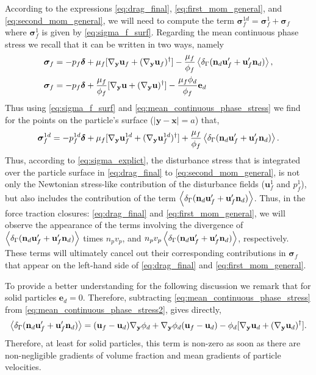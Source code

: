 According to the expressions \ref{eq:drag_final}, \ref{eq:first_mom_general}, and \ref{eq:second_mom_general}, we will need to compute the term $\bm\sigma^{1d}_f = \bm\sigma_f^1 + \bm\sigma_f$ where $\bm\sigma_f^1$ is given by \ref{eq:sigma_f_surf}. 
Regarding the mean continuous phase stress we recall that it can be written in two ways, namely 
\begin{align}
    \label{eq:mean_continuous_phase_stress}
    \bm\sigma_f
    &= - p_f \bm\delta 
    + \mu_f [\pddy \textbf{u}_f+ (\pddy \textbf{u}_f)^\dagger ]
    - \frac{\mu_f}{\phi_f}\avg{\delta_\Gamma (\textbf{n}_d \textbf{u}_f'+  \textbf{u}_f' \textbf{n}_d)}, \\
    \bm\sigma_f
    &= - p_f \bm\delta 
    + \frac{\mu_f}{\phi_f} [\pddy \textbf{u}+ (\pddy \textbf{u})^\dagger ]
    - \frac{\mu_f \phi_d}{\phi_f} \textbf{e}_d
    \label{eq:mean_continuous_phase_stress2}
\end{align}
Thus using \ref{eq:sigma_f_surf} and \ref{eq:mean_continuous_phase_stress} we find for the points on the particle's surface ($|\textbf{y}-\textbf{x}| = a$) that,
\begin{align}
    \bm\sigma_f^{1d}
    =
    - p_f^{1d} \bm\delta 
    + \mu_f [\pddy \textbf{u}_f^{1d}+ (\pddy \textbf{u}_f^{1d})^\dagger ]
    + \frac{\mu_f }{\phi_f}\avg{\delta_\Gamma (\textbf{n}_d \textbf{u}_f'+  \textbf{u}_f' \textbf{n}_d)}. 
    \label{eq:sigma_explict}
\end{align}
Thus, according to \ref{eq:sigma_explict}, the disturbance stress that is integrated over the particle surface in \ref{eq:drag_final} to \ref{eq:second_mom_general}, is not only the Newtonian stress-like contribution of the disturbance fields ($\textbf{u}_f^1$ and $p_f^1$), but also includes the contribution of the term $\left<\delta_\Gamma (\textbf{n}_d \textbf{u}_f'+  \textbf{u}_f' \textbf{n}_d)\right>$. 
Thus, in the force traction closures: \ref{eq:drag_final} and \ref{eq:first_mom_general}, we will observe the appearance of the terms involving the divergence of $\left<\delta_\Gamma (\textbf{n}_d \textbf{u}_f'+  \textbf{u}_f' \textbf{n}_d)\right>$ times $n_pv_p$, and  $n_pv_p \left<\delta_\Gamma (\textbf{n}_d \textbf{u}_f'+  \textbf{u}_f' \textbf{n}_d)\right>$, respectively. 
These terms will ultimately cancel out their corresponding contributions in $\bm\sigma_f$ that appear on the left-hand side of \ref{eq:drag_final} and \ref{eq:first_mom_general}. 

To provide a better understanding for the following discussion we remark that for solid particles $\textbf{e}_d = 0$. 
Therefore, subtracting \ref{eq:mean_continuous_phase_stress} from \ref{eq:mean_continuous_phase_stress2}, gives directly, 
\begin{equation}
    \avg{\delta_\Gamma (\textbf{n}_d \textbf{u}_f'+  \textbf{u}_f' \textbf{n}_d)}
    = 
    (\textbf{u}_f - \textbf{u}_d)\pddy \phi_d + \pddy \phi_d (\textbf{u}_f - \textbf{u}_d)
    -  \phi_d [\pddy \textbf{u}_d+ (\pddy \textbf{u}_d)^\dagger ]. 
    \label{eq:closure_un_nu}
\end{equation} 
Therefore, at least for solid particles, this term is non-zero as soon as there are non-negligible gradients of volume fraction and mean gradients of particle velocities. 


